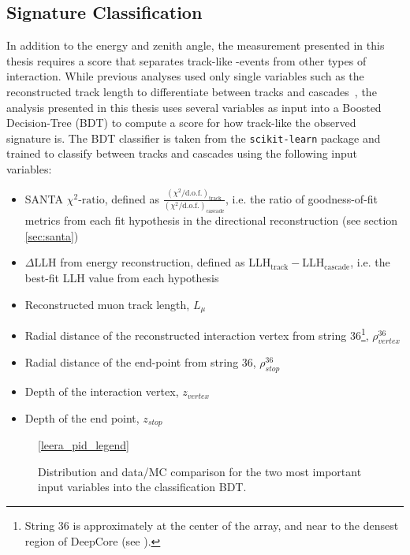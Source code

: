 \subsection{Signature Classification}
\label{sec:pid}
In addition to the energy and zenith angle, the measurement presented in this thesis requires a score that separates track-like \numucc-events from other types of interaction. While previous analyses used only single variables such as the reconstructed track length to differentiate between tracks and cascades~\cite{deepcore_sterile_2017, Aartsen_2015,IceCube:2019dqi}, the analysis presented in this thesis uses several variables as input into a Boosted Decision-Tree (BDT) to compute a score for how track-like the observed signature is. The BDT classifier is taken from the \texttt{scikit-learn}\cite{scikit-learn} package and trained to classify between tracks and cascades using the following input variables:
\begin{itemize}
    \item SANTA $\chi^2\textrm{-ratio}$, defined as  $\frac{(\chi^{2}/\mathrm{d.o.f.})_{\mathrm{track}}}{(\chi^{2}/\mathrm{d.o.f.})_{\mathrm{cascade}}}$, i.e. the ratio of goodness-of-fit metrics from each fit hypothesis in the directional reconstruction (see section \ref{sec:santa})
    \item $\Delta$LLH from energy reconstruction, defined as LLH$_\mathrm{track}-$LLH$_\mathrm{cascade}$, i.e. the best-fit LLH value from each hypothesis
    \item Reconstructed muon track length, $L_{\mu}$
    \item Radial distance of the reconstructed interaction vertex from string 36\footnote{String 36 is approximately at the center of the array, and near to the densest region of DeepCore (see ).}, $\rho^{36}_{vertex}$
    \item Radial distance of the end-point from string 36, $\rho^{36}_{stop}$
    \item Depth of the interaction vertex, $z_{vertex}$
    \item Depth of the end point, $z_{stop}$
\end{itemize}
\begin{figure}
    \centering
    \ref{leera_pid_legend}


    
    
    \caption{Distribution and data/MC comparison for the two most important input variables into the classification BDT.}
    \label{fig:bdt-input-vars}
\end{figure}
